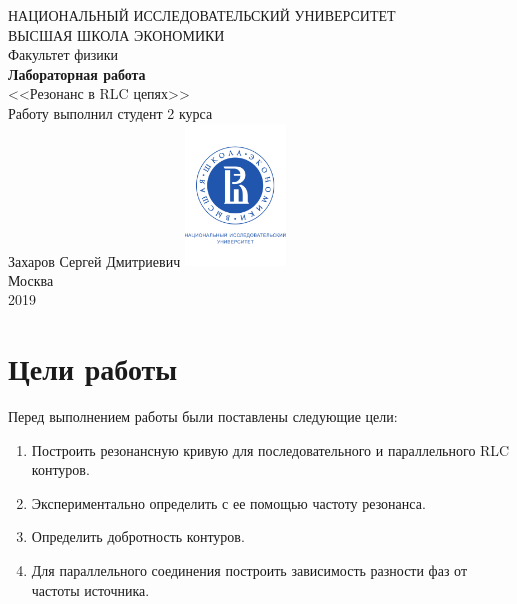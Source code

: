 \documentclass[a4paper, 12pt]{article}
\begin{document}
	\begin{titlepage}
		\begin{center}
			$$$$
			$$$$
			$$$$
			$$$$
			{\Large{НАЦИОНАЛЬНЫЙ ИССЛЕДОВАТЕЛЬСКИЙ УНИВЕРСИТЕТ}}\\
			\vspace{0.1cm}
			{\Large{ВЫСШАЯ ШКОЛА ЭКОНОМИКИ}}\\
			\vspace{0.25cm}
			{\large{Факультет физики}}\\
			\vspace{5.5cm}
			{\Huge\textbf{{Лабораторная работа}}}\\%
			\vspace{1cm}
			{\LARGE{<<Резонанс в RLC цепях>>}}\\%
			\vspace{2cm}
			{Работу выполнил студент 2 курса}\\
			{Захаров Сергей Дмитриевич}
			\vfill
			\includegraphics[width = 0.2\textwidth]{HSElogo}\\
			\vfill
			Москва\\
			2019
		\end{center}
	\end{titlepage}

\tableofcontents

\newpage

\section{Цели работы}

Перед выполнением работы были поставлены следующие цели:

\begin{enumerate}
	\item Построить резонансную кривую для последовательного и параллельного RLC контуров.
	
	\item Экспериментально определить с ее помощью частоту резонанса.
	
	\item Определить добротность контуров.
	
	\item Для параллельного соединения построить зависимость разности фаз от частоты источника.
\end{enumerate}
\end{document}
